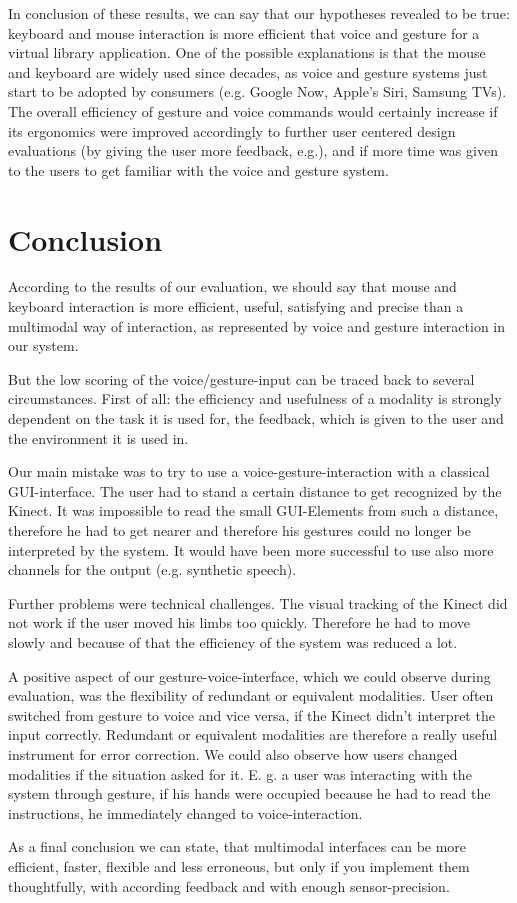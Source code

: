 \documentclass[a4paper, 10pt]{article}
\begin{document}
	\par{In conclusion of these results, we can say that our hypotheses revealed to be true: keyboard and mouse interaction is more efficient that voice and gesture for a virtual library application. One of the possible explanations is that the mouse and keyboard are widely used since decades, as voice and gesture systems just start to be adopted by consumers (e.g. Google Now, Apple’s Siri, Samsung TVs). The overall efficiency of gesture and voice commands would certainly increase if its ergonomics were improved accordingly to further user centered design evaluations (by giving the user more feedback, e.g.), and if more time was given to the users to get familiar with the voice and gesture system.}
	
	\section{Conclusion}
	
	\par{According to the results of our evaluation, we should say that mouse and keyboard interaction is more efficient, useful, satisfying and precise than a multimodal way of interaction, as represented by voice and gesture interaction in our system.}
	\par{But the low scoring of the voice/gesture-input can be traced back to several circumstances. First of all: the efficiency and usefulness of a modality is strongly dependent on the task it is used for, the feedback, which is given to the user and the environment it is used in. }
	\par{Our main mistake was to try to use a voice-gesture-interaction with a classical GUI-interface. The user had to stand a certain distance to get recognized by the Kinect. It was impossible to read the small GUI-Elements from such a distance, therefore he had to get nearer and therefore his gestures could no longer be interpreted by the system. It would have been more successful to use also more channels for the output (e.g. synthetic speech).}
	\par{Further problems were technical challenges. The visual tracking of the Kinect did not work if the user moved his limbs too quickly. Therefore he had to move slowly and because of that the efficiency of the system was reduced a lot.}
	\par{A positive aspect of our gesture-voice-interface, which we could observe during evaluation, was the flexibility of redundant or equivalent modalities. User often switched from gesture to voice and vice versa, if the Kinect didn't interpret the input correctly. Redundant or equivalent modalities are therefore a really useful instrument for error correction. We could also observe how users changed modalities if the situation asked for it. E. g. a user was interacting with the system through gesture, if his hands were occupied because he had to read the instructions, he immediately changed to voice-interaction.}
	\par{As a final conclusion we can state, that multimodal interfaces can be more efficient, faster, flexible and less erroneous, but only if you implement them thoughtfully, with according feedback and with enough sensor-precision.}
	
\end{document}
